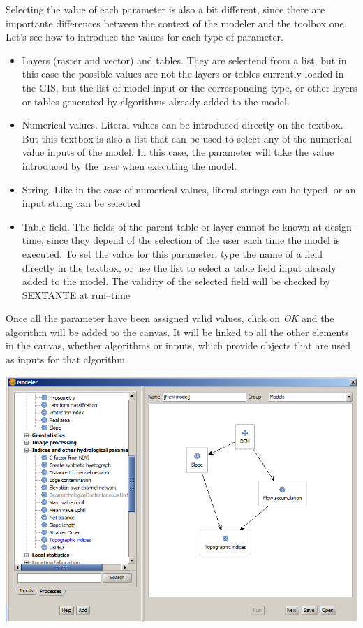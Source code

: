 Selecting the value of each parameter is also a bit different, since there are importante differences between the context of the modeler and the toolbox one. Let's see how to introduce the values for each type of parameter.
\begin{itemize}
	\item Layers (raster and vector) and tables. They are selectend from a list, but in this case the possible values are not the layers or tables currently loaded in the GIS, but the list of model input or the corresponding type, or other layers or tables generated by algorithms already added to the model.
	\item Numerical values. Literal values can be introduced directly on the textbox. But this textbox is also a list that can be used to select any of the numerical value inputs of the model. In this case, the parameter will take the value introduced by the user when executing the model. 
	\item String. Like in the case of numerical values, literal strings can be typed, or an input string can be selected	
	\item Table field. The fields of the parent table or layer cannot be known at design--time, since they depend of the selection of the user each time the model is executed. To set the value for this parameter, type the name of a field directly in the textbox, or use the list to select a table field input already added to the model. The validity of the selected field will be checked by SEXTANTE at run--time
\end{itemize}

Once all the parameter have been assigned valid values, click on \emph{OK} and the algorithm will be added to the canvas. It will be linked to all the other elements in the canvas, whether algorithms or inputs, which provide objects that are used as inputs for that algorithm.

\begin{center}
\includegraphics[width=.8\columnwidth]{models_parameters5.png}
\end{center}


